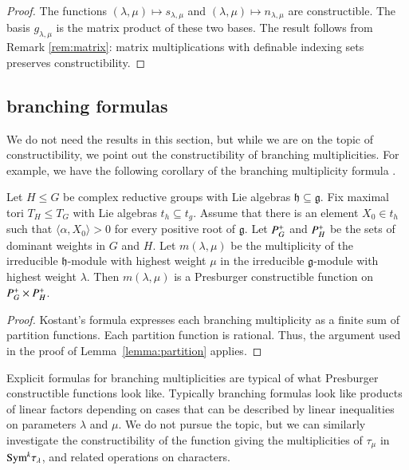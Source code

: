 \begin{proof}  The functions $(\lambda,\mu)\mapsto s_{\lambda,\mu}$ and $(\lambda,\mu)\mapsto n_{\lambda,\mu}$
are constructible.
The basis $g_{\lambda,\mu}$
is the matrix product of these two bases.  The result follows from Remark \ref{rem:matrix}:
matrix multiplications with definable indexing sets preserves constructibility.
\end{proof}

\subsection{branching formulas}

We do not need the results in this section, but while we are on the topic of constructibility,
we point out the constructibility of branching multiplicities.
For example, we have the following corollary of the branching
multiplicity formula \cite[Theorem ~8.2.1]{goodman}.

\begin{lemma} Let $H\le G$ be complex reductive groups with Lie algebras ${\mathfrak h}\subseteq {\mathfrak g}$.
Fix maximal tori $T_H\le T_G$ with Lie algebras $t_h\subseteq t_g$.  Assume that there is an element
$X_0\in t_h$ such that $\langle\alpha,X_0\rangle>0$ for every positive root of ${\mathfrak g}$.
Let $P^+_G$ and $P^+_H$ be the sets of dominant weights in $G$ and $H$.  Let $m(\lambda,\mu)$
be the multiplicity of the irreducible $\mathfrak h$-module with highest weight $\mu$ in the irreducible
$\mathfrak g$-module with highest weight $\lambda$.  Then $m(\lambda,\mu)$ is a Presburger constructible
function on $P^+_G\times P^+_H$.
\end{lemma}

\begin{proof}  Kostant's formula expresses each branching multiplicity as a finite sum of partition
functions.  Each partition function is rational.  
Thus, the argument used in the proof of Lemma~\ref{lemma:partition} applies.
\end{proof}

Explicit formulas for branching multiplicities are typical of what Presburger constructible functions look like.
Typically branching formulas look like products of linear factors depending on cases that can be
described by linear inequalities on parameters $\lambda$ and $\mu$.
We do not pursue the topic, but we can similarly investigate the constructibility of the function giving the
multiplicities of $\tau_\mu$ in ${\operatorname{Sym}}^k \tau_\lambda$, and related operations on characters.

